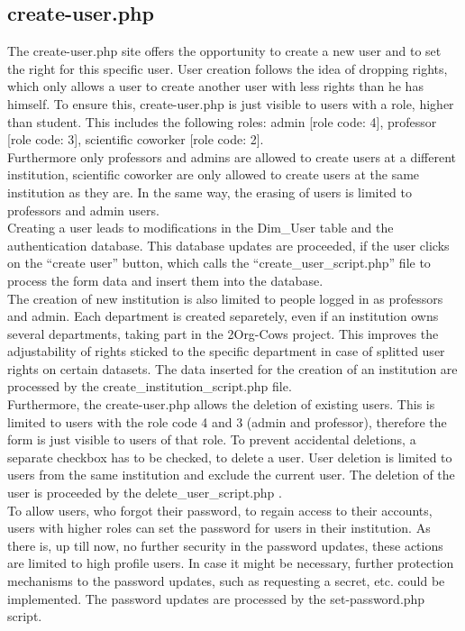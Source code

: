 
\label{create-user.php}
\subsection{create-user.php}
The create-user.php site offers the opportunity to create a new user and to set the right for this specific user. User creation follows the idea of dropping rights, 
which only allows a user to create another user with less rights than he has himself. To ensure this, create-user.php is just visible to users with a role, higher than student.
This includes the following roles: admin [role code: 4], professor [role code: 3], scientific coworker [role code: 2]. \\
Furthermore only professors and admins are allowed to create users at a different institution, scientific coworker are only allowed to create users at the 
same institution as they are. In the same way, the erasing of users is limited to professors and admin users.\\
Creating a user leads to modifications in the Dim\_User table and the authentication database. This database updates are proceeded, if the user clicks on 
the ``create user'' button, which calls the ``create\_user\_script.php'' file to process the form data and insert them into the database.\\ 
The creation of new institution is also limited to people logged in as professors and admin. Each department is created separetely, even if an institution owns several departments, 
taking part in the 2Org-Cows project. This improves the adjustability of rights sticked to the specific department in case of splitted user rights on certain datasets.
The data inserted for the creation of an institution are processed by the create\_institution\_script.php file.\\
Furthermore, the create-user.php allows the deletion of existing users. This is limited to users with the role code 4 and 3 (admin and professor), therefore the form is just visible 
to users of that role. To prevent accidental deletions, a separate checkbox has to be checked, to delete a user. User deletion is limited to users from the same institution and exclude 
the current user. The deletion of the user is proceeded by the delete\_user\_script.php .\\
To allow users, who forgot their password, to regain access to their accounts, users with higher roles can set the password for users in their institution. As there is, up till now, no further security in the password updates, these actions are limited to high profile users. In case it might be necessary, further protection mechanisms to the password updates, such as requesting a secret, etc. could be implemented. The password updates are processed by the set-password.php script.\\
